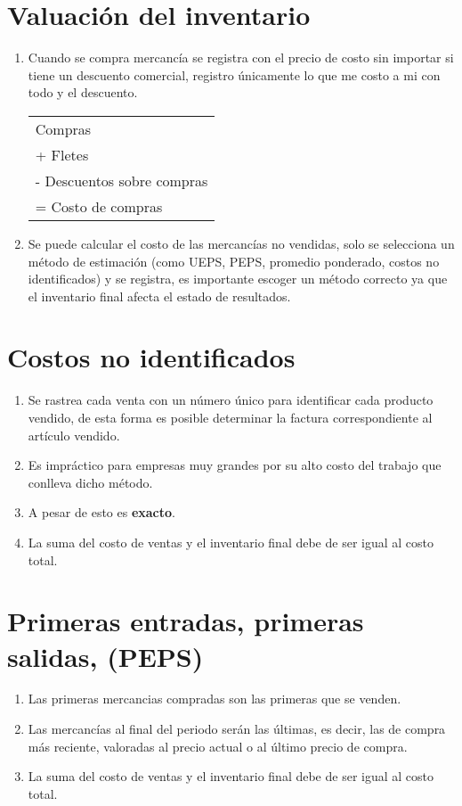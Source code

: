 \documentclass{article}
\begin{document}
\section{Valuación del inventario}
\begin{enumerate}
    \item Cuando se compra mercancía se registra con el precio de costo sin importar si tiene un descuento comercial, registro únicamente lo que me costo a mi con todo y el descuento. \newline 
    \begin{center}
        \begin{tabular}{ | p{5cm}| }
            \hline
            Compras \\
            + Fletes \\ 
            - Descuentos sobre compras \\ 
            = Costo de compras \\ 
            \hline
           \end{tabular}
    \end{center}
    
    \item Se puede calcular el costo de las mercancías no vendidas, solo se selecciona un método de estimación (como UEPS, PEPS, promedio ponderado, costos no identificados) y se registra, es importante escoger un método correcto ya que el inventario final afecta el estado de resultados.
\end{enumerate}

\section{Costos no identificados}
\begin{enumerate}
    \item Se rastrea cada venta con un número único para identificar cada producto vendido, de esta forma es posible determinar la factura correspondiente al artículo vendido.
    \item Es impráctico para empresas muy grandes por su alto costo del trabajo que conlleva dicho método.
    \item A pesar de esto es \textbf{exacto}.
    \item La suma del costo de ventas y el inventario final debe de ser igual al costo total.
\end{enumerate}


\section{Primeras entradas, primeras salidas, (PEPS)}
\begin{enumerate}
    \item Las primeras mercancias compradas son las primeras que se venden.
    \item Las mercancías al final del periodo serán las últimas, es decir, las de compra más reciente, valoradas al precio actual o al último precio de compra.
    \item La suma del costo de ventas y el inventario final debe de ser igual al costo total.
\end{enumerate}
\end{document}
